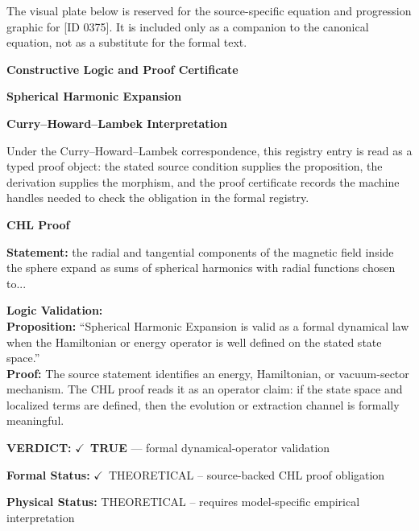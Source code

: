 \begingroup\footnotesize\sloppy
The visual plate below is reserved for the source-specific equation and progression graphic for [ID 0375]. It is included only as a companion to the canonical equation, not as a substitute for the formal text.
\par\endgroup
\ifTZPDarkEdition
{}
\fi

\clearpage
\begingroup\tzpsupportsetup
\noindent\textbf{\fontsize{10.8pt}{12.8pt}\selectfont [ID 0375] Constructive Logic and Proof Certificate}\par
\noindent\textbf{\fontsize{10pt}{12pt}\selectfont Spherical Harmonic Expansion}\par
\vspace{0.45em}
\begingroup
\footnotesize
\setlength{\parskip}{0.22em}
\setlength{\parindent}{0pt}
\noindent\textbf{Curry--Howard--Lambek Interpretation}\par
Under the Curry--Howard--Lambek correspondence, this registry entry is read as a typed proof
object: the stated source condition supplies the proposition, the derivation supplies the
morphism, and the proof certificate records the machine handles needed to check the obligation
in the formal registry.

\vspace{0.45em}
\noindent\textbf{CHL Proof}\par
\textbf{Statement:} the radial and tangential components of the magnetic field inside the sphere expand as
sums of spherical harmonics with radial functions chosen to...

\textbf{Logic Validation:}\\
\textbf{Proposition:} ``Spherical Harmonic Expansion is valid as a formal dynamical law when the Hamiltonian or
energy operator is well defined on the stated state space.''\\
\textbf{Proof:} The source statement identifies an energy, Hamiltonian, or vacuum-sector mechanism. The
CHL proof reads it as an operator claim: if the state space and localized terms are
defined, then the evolution or extraction channel is formally meaningful.

\textbf{VERDICT:} \ensuremath{\checkmark}\ \textbf{TRUE} --- formal dynamical-operator validation

\textbf{Formal Status:} \ensuremath{\checkmark}\ THEORETICAL -- source-backed CHL proof obligation

\textbf{Physical Status:} THEORETICAL -- requires model-specific empirical interpretation
\par\vspace{0.45em}
\par
\ifTZPDarkEdition
{}
\fi
\endgroup
\endgroup
